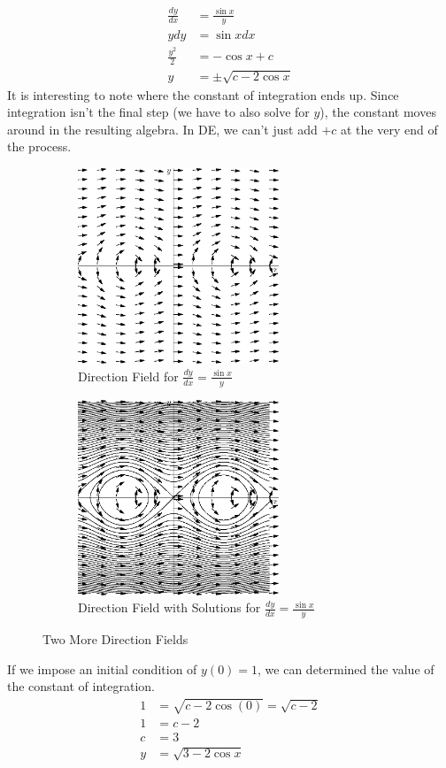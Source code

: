 \documentclass[fleqn,letterpaper]{report}
\begin{document}
\begin{example}
\begin{align*}
\frac{dy}{dx} & = \frac{\sin x}{y} \\
y dy & = \sin x dx \\
\frac{y^2}{2} & = - \cos x + c \\
y & = \pm \sqrt{c - 2\cos x}
\end{align*}
It is interesting to note where the constant of integration ends
up. Since integration isn't the final step (we have to also
solve for $y$), the constant moves around in the resulting
algebra. In DE, we can't just add $+c$ at the very end of the
process.

\begin{figure}[t]
\centering
\begin{subfigure}{.5\textwidth}
\centering
\includegraphics[width=6cm]{figure16.eps}
\caption{Direction Field for $\frac{dy}{dx}= \frac{\sin x}{y}$}
\end{subfigure}%
\begin{subfigure}{.5\textwidth}
\centering
\includegraphics[width=6cm]{figure17.eps}
\caption{Direction Field with Solutions for $\frac{dy}{dx}=
\frac{\sin x}{y}$}
\end{subfigure}
\caption{Two More Direction Fields}
\label{figure-direction-field6}
\end{figure}
If we impose an initial condition of $y(0) = 1$, we can
determined the value of the constant of integration.
\begin{align*}
1 & = \sqrt{c - 2 \cos (0)} = \sqrt{c-2}\\
1 & = c-2 \\
c & = 3 \\
y & = \sqrt{3 - 2 \cos x} 
\end{align*}
\end{example}
\end{document}
